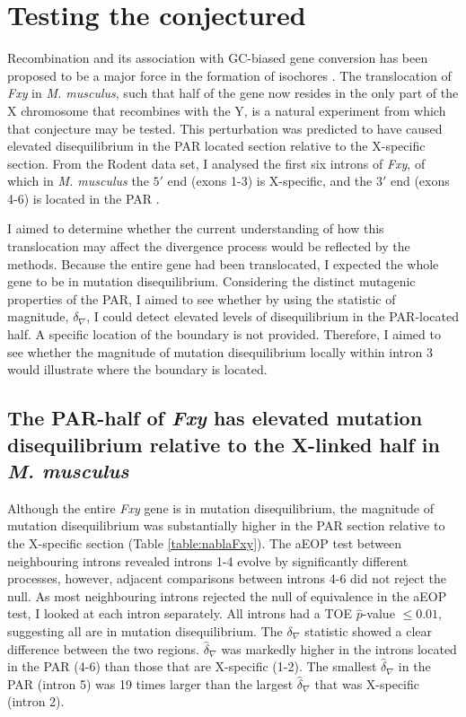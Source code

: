 

\section{Testing the conjectured}

Recombination and its association with GC-biased gene conversion has been proposed to be a major force in the formation of isochores \citep{Montoya-Burgos2003RecombinationGenomes}. The translocation of \textit{Fxy} in \textit{M. musculus}, such that half of the gene now resides in the only part of the X chromosome that recombines with the Y, is a natural experiment from which that conjecture may be tested. This perturbation was predicted to have caused elevated disequilibrium in the PAR located section relative to the X-specific section. From the Rodent data set, I analysed the first six introns of \textit{Fxy}, of which in \textit{M. musculus} the $5'$ end (exons 1-3) is X-specific, and the $3'$ end (exons 4-6) is located in the PAR \citep{Palmer1997AMice}. 

I aimed to determine whether the current understanding of how this translocation may affect the divergence process would be reflected by the methods. Because the entire gene had been translocated, I expected the whole gene to be in mutation disequilibrium. Considering the distinct mutagenic properties of the PAR, I aimed to see whether by using the statistic of magnitude, $\delta_\nabla$, I could detect elevated levels of disequilibrium in the PAR-located half. A specific location of the boundary is not provided. Therefore, I aimed to see whether the magnitude of mutation disequilibrium locally within intron 3 would illustrate where the boundary is located. 

\subsection{The PAR-half of \textit{Fxy} has elevated mutation disequilibrium relative to the X-linked half in \textit{M. musculus}}
\label{Fxy_TOE}

Although the entire \textit{Fxy} gene is in mutation disequilibrium, the magnitude of mutation disequilibrium was substantially higher in the PAR section relative to the X-specific section (Table \ref{table:nablaFxy}). The \acrshort{aEOP} test between neighbouring introns revealed introns 1-4 evolve by significantly different processes, however, adjacent comparisons between introns 4-6 did not reject the null. As most neighbouring introns rejected the null of equivalence in the aEOP test, I looked at each intron separately. All introns had a TOE $\hat p$-value $\leq 0.01$, suggesting all are in mutation disequilibrium. The $\delta_\nabla$ statistic showed a clear difference between the two regions. $\hat\delta_\nabla$ was markedly higher in the introns located in the PAR (4-6)  than those that are X-specific (1-2). The smallest $\hat \delta_\nabla$ in the PAR (intron 5) was 19 times larger than the largest $\hat \delta_\nabla$ that was X-specific (intron 2).

